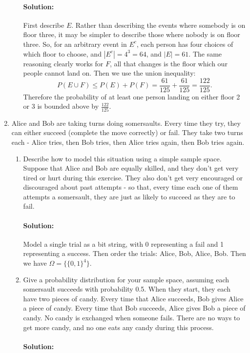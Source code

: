 \documentclass{article}
\begin{document}
\begin{enumerate}
\begin{enumerate}
                \paragraph{Solution: }First describe $E$. Rather than describing the events where somebody is on floor three, it may be simpler to describe those where nobody is on floor three. So, for an arbitrary event in $E^{c}$, each person has four choices of which floor to choose, and $|E^{c}|=4^3=64$, and $|E|=61$. The same reasoning clearly works for $F$, all that changes is the floor which our people cannot land on. Then we use the union inequality:
                    \[
                        P(E\cup F)\leq P(E)+P(F)=\frac{61}{125}+\frac{61}{125}=\frac{122}{125}
                    .\] 
                    Therefore the probability of at least one person landing on either floor 2 or 3 is bounded above by $\frac{122}{125}$.
        \end{enumerate}
        \newpage
\item Alice and Bob are taking turns doing somersaults. Every time they try, they can either succeed (complete the move correctly) or fail. They take two turns each - Alice tries, then Bob tries, then Alice tries again, then Bob tries again.
\begin{enumerate}
    \item Describe how to model this situation using a simple sample space. Suppose that Alice and Bob are equally skilled, and they don't get very tired or hurt during this exercise. They also don't get very encouraged or discouraged about past attempts - so that, every time each one of them attempts a somersault, they are just as likely to succeed as they are to fail.
        \paragraph{Solution: }Model a single trial as a bit string, with 0 representing a fail and 1 representing a success. Then order the trials: Alice, Bob, Alice, Bob. Then we have $\Omega=\{\{ 0,1\}^{4}\} $.
    \item Give a probability distribution for your sample space, assuming each somersault succeeds with probability 0.5. When they start, they each have two pieces of candy. Every time that Alice succeeds, Bob gives Alice a piece of candy. Every time that Bob succeeds, Alice gives Bob a piece of candy. No candy is exchanged when someone fails. There are no ways to get more candy, and no one eats any candy during this process.
        \paragraph{Solution: }


\end{enumerate}
\end{enumerate}
\end{document}
